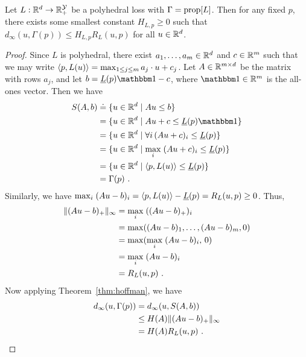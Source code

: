 \begin{lemma*}
  Let $L: \mathbb{R}^d \to \mathbb{R}_+^{\mathcal{Y}}$ be a polyhedral loss with $\Gamma = \mathrm{prop}[L]$.
  Then for any fixed $p$, there exists some smallest constant $H_{L,p} \geq 0$ such that $d_{\infty}(u,\Gamma(p)) \leq H_{L,p} R_L(u,p)$ for all $u \in \mathbb{R}^d$.
\end{lemma*}
\begin{proof}
  Since $L$ is polyhedral, there exist $a_1,\ldots,a_m \in \mathbb{R}^d$ and $c\in\mathbb{R}^m$ such that we may write $\langle p, L(u) \rangle = \max_{1\leq j\leq m} a_j \cdot u + c_j$.
  Let $A \in \mathbb{R}^{m\times d}$ be the matrix with rows $a_j$, and let $b = \risk{L}(p)\ones - c$, where $\ones\in\reals^m$ is the all-ones vector.
  Then we have
  \begin{align*}
    S(A,b)
    &\defeq \{u\in\reals^d \mid A u \leq b\}
    \\
    &= \{u\in\reals^d \mid A u + c \leq \risk{L}(p)\ones\}
    \\
    &= \{u\in\reals^d \mid \forall i\, (A u + c)_i \leq \risk{L}(p)\}
    \\
    &= \{u\in\reals^d \mid \max_i \;(A u + c)_i \leq \risk{L}(p)\}
    \\
    &= \{u\in\reals^d \mid \inprod{p}{L(u)} \leq \risk{L}(p)\}
    \\
    & = \Gamma(p)~.
  \end{align*}
  Similarly, we have $\max_i\; (A u - b)_i = \langle p, L(u) \rangle - \underline{L}(p) = R_{L}(u,p) \geq 0$.
  Thus,
  \begin{align*}
    \|(Au - b)_+\|_\infty
    &= \max_i\; ((Au - b)_+)_i
    \\
    &= \max((Au - b)_1,\ldots,(Au - b)_m, 0)
    \\
    &= \max(\max_i\; (Au - b)_i, \, 0)
    \\
    &= \max_i\; (Au - b)_i
    \\
    &= R_{L}(u,p)~.
  \end{align*}
  Now applying Theorem~\ref{thm:hoffman}, we have
  \begin{align*}
    d_\infty(u,\Gamma(p))
    &=    d_\infty(u,S(A,b))
    \\
    &\leq H(A) \|(Au-b)_+\|_\infty
    \\
    &= H(A) R_{L}(u,p)~.
  \end{align*}
\end{proof}

